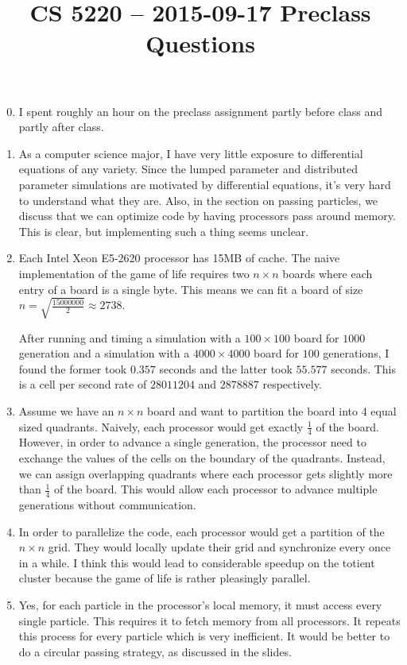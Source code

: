 \documentclass{hw}
\title{CS 5220 -- 2015-09-17 Preclass Questions}
\begin{document}
\maketitle{}

\begin{enumerate}
  \setcounter{enumi}{-1}
  \item
    I spent roughly an hour on the preclass assignment partly before class and
    partly after class.

  \item
    As a computer science major, I have very little exposure to differential
    equations of any variety. Since the lumped parameter and distributed
    parameter simulations are motivated by differential equations, it's very
    hard to understand what they are. Also, in the section on passing
    particles, we discuss that we can optimize code by having processors pass
    around memory. This is clear, but implementing such a thing seems unclear.

  \item
    Each Intel Xeon E5-2620 processor has 15MB of cache. The naive
    implementation of the game of life requires two $n \times n$ boards where
    each entry of a board is a single byte. This means we can fit a board of
    size $n = \sqrt{\frac{15000000}{2}} \approx 2738$.

    After running and timing a simulation with a $100 \times 100$ board for
    $1000$ generation and a simulation with a $4000 \times 4000$ board for
    $100$ generations, I found the former took $0.357$ seconds and the latter
    took $55.577$ seconds. This is a cell per second rate of $28011204$ and
    $2878887$ respectively.

  \item
    Assume we have an $n \times n$ board and want to partition the board into 4
    equal sized quadrants. Naively, each processor would get exactly
    $\frac{1}{4}$ of the board. However, in order to advance a single
    generation, the processor need to exchange the values of the cells on the
    boundary of the quadrants. Instead, we can assign overlapping quadrants
    where each processor gets slightly more than $\frac{1}{4}$ of the board.
    This would allow each processor to advance multiple generations without
    communication.

  \item
    In order to parallelize the code, each processor would get a partition of
    the $n \times n$ grid. They would locally update their grid and synchronize
    every once in a while. I think this would lead to considerable speedup on
    the totient cluster because the game of life is rather pleasingly parallel.

  \item
    Yes, for each particle in the processor's local memory, it must access
    every single particle. This requires it to fetch memory from all
    processors. It repeats this process for every particle which is very
    inefficient. It would be better to do a circular passing strategy, as
    discussed in the slides.
\end{enumerate}
\end{document}
